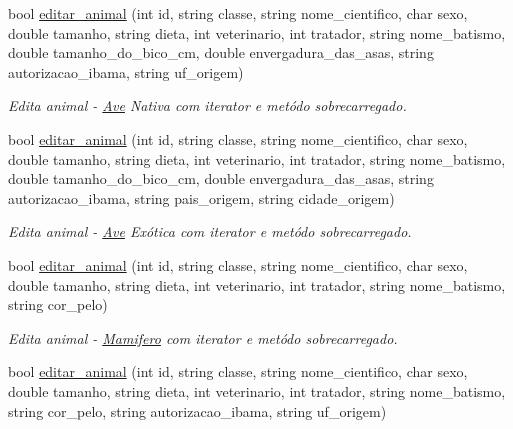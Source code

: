 \begin{DoxyCompactItemize}
\mbox{\label{class_sistema_ade0cf5fc24e2e2d2fca0ef0b2f93e98d}} 
bool \mbox{\hyperlink{class_sistema_ade0cf5fc24e2e2d2fca0ef0b2f93e98d}{editar\+\_\+animal}} (int id, string classe, string nome\+\_\+cientifico, char sexo, double tamanho, string dieta, int veterinario, int tratador, string nome\+\_\+batismo, double tamanho\+\_\+do\+\_\+bico\+\_\+cm, double envergadura\+\_\+das\+\_\+asas, string autorizacao\+\_\+ibama, string uf\+\_\+origem)
\begin{DoxyCompactList}\small\item\em Edita animal -\/ \mbox{\hyperlink{class_ave}{Ave}} Nativa com iterator e metódo sobrecarregado. \end{DoxyCompactList}\item 
\mbox{\label{class_sistema_a57325ee49fb526d28f3fe1609e6d75b0}} 
bool \mbox{\hyperlink{class_sistema_a57325ee49fb526d28f3fe1609e6d75b0}{editar\+\_\+animal}} (int id, string classe, string nome\+\_\+cientifico, char sexo, double tamanho, string dieta, int veterinario, int tratador, string nome\+\_\+batismo, double tamanho\+\_\+do\+\_\+bico\+\_\+cm, double envergadura\+\_\+das\+\_\+asas, string autorizacao\+\_\+ibama, string pais\+\_\+origem, string cidade\+\_\+origem)
\begin{DoxyCompactList}\small\item\em Edita animal -\/ \mbox{\hyperlink{class_ave}{Ave}} Exótica com iterator e metódo sobrecarregado. \end{DoxyCompactList}\item 
\mbox{\label{class_sistema_a44e361f5b7df5e0f795886a68a6621d6}} 
bool \mbox{\hyperlink{class_sistema_a44e361f5b7df5e0f795886a68a6621d6}{editar\+\_\+animal}} (int id, string classe, string nome\+\_\+cientifico, char sexo, double tamanho, string dieta, int veterinario, int tratador, string nome\+\_\+batismo, string cor\+\_\+pelo)
\begin{DoxyCompactList}\small\item\em Edita animal -\/ \mbox{\hyperlink{class_mamifero}{Mamifero}} com iterator e metódo sobrecarregado. \end{DoxyCompactList}\item 
\mbox{\label{class_sistema_a07a6f7a3389aa4ccba8bc55a4f3307d4}} 
bool \mbox{\hyperlink{class_sistema_a07a6f7a3389aa4ccba8bc55a4f3307d4}{editar\+\_\+animal}} (int id, string classe, string nome\+\_\+cientifico, char sexo, double tamanho, string dieta, int veterinario, int tratador, string nome\+\_\+batismo, string cor\+\_\+pelo, string autorizacao\+\_\+ibama, string uf\+\_\+origem)

\end{DoxyCompactItemize}

